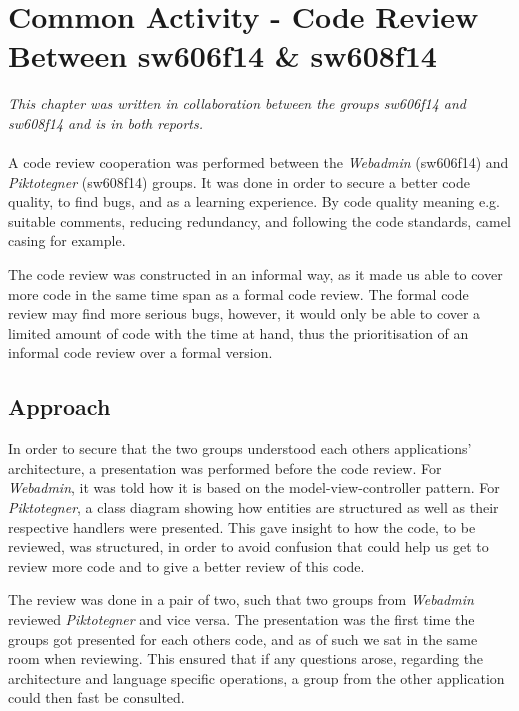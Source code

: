 \chapter{Common Activity - Code Review Between sw606f14 \& sw608f14}\label{chap:codeReviewCommonActivity}
\textit{This chapter was written in collaboration between the groups sw606f14 and sw608f14 and is in both reports.}\\\\

A code review cooperation was performed between the \textit{Webadmin} (sw606f14) and \textit{Piktotegner} (sw608f14) groups.
It was done in order to secure a better code quality, to find bugs, and as a learning experience.
By code quality meaning e.g. suitable comments, reducing redundancy, and following the code standards, camel casing for example.

The code review was constructed in an informal way, as it made us able to cover more code in the same time span as a formal code review.
The formal code review may find more serious bugs, however, it would only be able to cover a limited amount of code with the time at hand, thus the prioritisation of an informal code review over a formal version.


\section*{Approach}
In order to secure that the two groups understood each others applications' architecture, a presentation was performed before the code review. 
For \textit{Webadmin}, it was told how it is based on the model-view-controller pattern.
For \textit{Piktotegner}, a class diagram showing how entities are structured as well as their respective handlers were presented.
This gave insight to how the code, to be reviewed, was structured, in order to avoid confusion that could help us get to review more code and to give a better review of this code.

The review was done in a pair of two, such that two groups from \textit{Webadmin} reviewed \textit{Piktotegner} and vice versa.
The presentation was the first time the groups got presented for each others code, and as of such we sat in the same room when reviewing.
This ensured that if any questions arose, regarding the architecture and language specific operations, a group from the other application could then fast be consulted.

